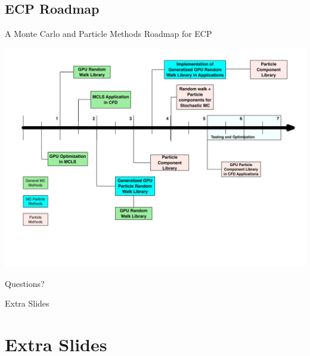 \documentclass{beamer}
\begin{document}
\subsection{ECP Roadmap}

\begin{frame}{A Monte Carlo and Particle Methods Roadmap for ECP}

  \centering
  \includegraphics[width=1\textwidth]{timeline}

\end{frame}


\begin{frame}
\vfill
\centering
\huge Questions?
\vfill
\end{frame}


\begin{frame}
\vfill
\centering
\huge Extra Slides
\vfill
\end{frame}

\section*{Extra Slides}
\end{document}
